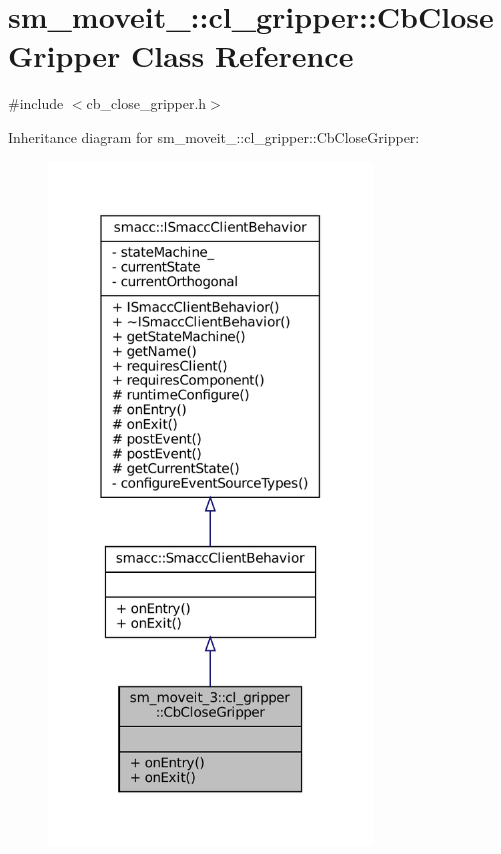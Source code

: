 \hypertarget{classsm__moveit__3_1_1cl__gripper_1_1CbCloseGripper}{}\section{sm\+\_\+moveit\+\_\+:\+:cl\+\_\+gripper\+:\+:Cb\+Close\+Gripper Class Reference}
\label{classsm__moveit__3_1_1cl__gripper_1_1CbCloseGripper}


{\ttfamily \#include $<$cb\+\_\+close\+\_\+gripper.\+h$>$}



Inheritance diagram for sm\+\_\+moveit\+\_\+:\+:cl\+\_\+gripper\+:\+:Cb\+Close\+Gripper\+:
\nopagebreak
\begin{figure}[H]
\begin{center}
\leavevmode
\includegraphics[width=244pt]{classsm__moveit__3_1_1cl__gripper_1_1CbCloseGripper__inherit__graph}
\end{center}
\end{figure}


